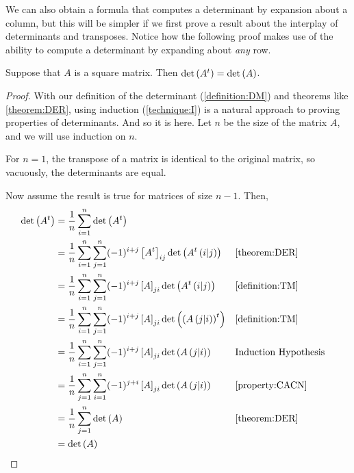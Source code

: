 \documentclass{ximera}
\begin{document}
We can also obtain a formula that computes a determinant by expansion
about a column, but this will be simpler if we first prove a result
about the interplay of determinants and transposes.  Notice how the
following proof makes use of the ability to compute a determinant by
expanding about \textit{any} row.

\begin{theorem}
  \label{theorem:DT}
  Suppose that $A$ is a square matrix.  Then $\det\left(A^{t}\right)=\det\left(A\right)$.

  \begin{proof}
    With our definition of the determinant (\ref{definition:DM}) and
    theorems like \ref{theorem:DER}, using induction
    (\ref{technique:I}) is a natural approach to proving properties of
    determinants.  And so it is here.  Let $n$ be the size of the
    matrix $A$, and we will use induction on $n$.

    For $n=1$, the transpose of a matrix is identical to the original
    matrix, so vacuously, the determinants are equal.

    Now assume the result is true for matrices of size $n-1$.  Then,
    \begin{align*}
      \det\left(A^{t}\right)
      &=\frac{1}{n}\sum_{i=1}^{n}\det\left(A^{t}\right)\\
      &=
        \frac{1}{n}\sum_{i=1}^{n}\sum_{j=1}^{n}(-1)^{i+j}
        \left\lbrack A^{t}\right\rbrack_{ij}\det\left(A^{t}\left(i|j\right)\right)
      &&\ref{theorem:DER}\\
      &=
        \frac{1}{n}\sum_{i=1}^{n}\sum_{j=1}^{n}(-1)^{i+j}
        \left\lbrack A\right\rbrack_{ji}\det\left(A^{t}\left(i|j\right)\right)
      &&\ref{definition:TM}\\
      &=
        \frac{1}{n}\sum_{i=1}^{n}\sum_{j=1}^{n}(-1)^{i+j}
        \left\lbrack A\right\rbrack_{ji}\det\left(\left(A\left(j|i\right)\right)^{t}\right)
      &&\ref{definition:TM}\\
      &=
        \frac{1}{n}\sum_{i=1}^{n}\sum_{j=1}^{n}(-1)^{i+j}
        \left\lbrack A\right\rbrack_{ji}\det\left(A\left(j|i\right)\right)
      &&\text{Induction Hypothesis}\\
      &=
        \frac{1}{n}\sum_{j=1}^{n}\sum_{i=1}^{n}(-1)^{j+i}
        \left\lbrack A\right\rbrack_{ji}\det\left(A\left(j|i\right)\right)
      &&\ref{property:CACN}\\
      &=
        \frac{1}{n}\sum_{j=1}^{n}\det\left(A\right)
      &&\ref{theorem:DER}\\
      &=\det\left(A\right)
    \end{align*}
  \end{proof}
\end{theorem}
\end{document}
